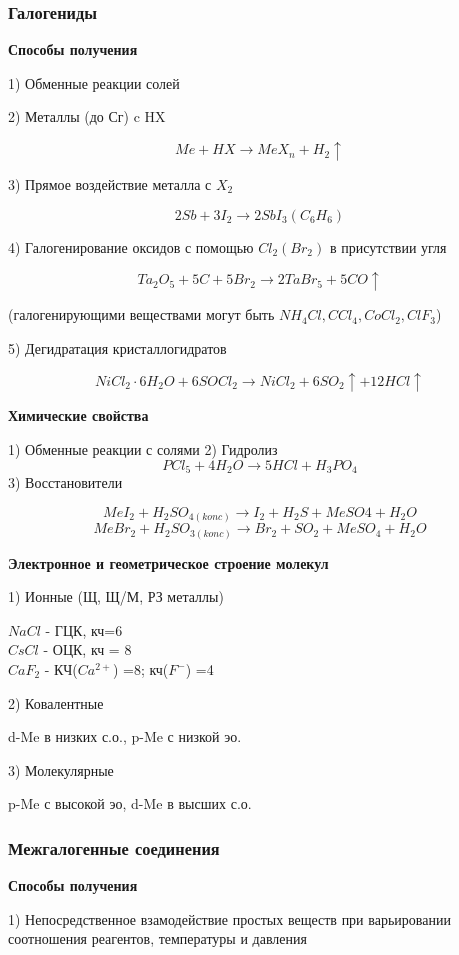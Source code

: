 \documentclass[14pt,a4paper]{scrartcl}
\begin{document}
\subsubsection{Галогениды}

\textbf{Способы получения}

1) Обменные реакции солей

2) Металлы (до Сг) c HX

$$Me + HX \rightarrow MeX_n + H_2\uparrow$$

3) Прямое воздействие металла с $X_2$

$$2Sb + 3I_2 \rightarrow 2SbI_3 (C_6H_6)$$

4) Галогенирование оксидов с помощью $Cl_2(Br_2)$ в присутствии угля

$$Ta_2O_5 + 5C + 5Br_2 \rightarrow 2TaBr_5 +5CO \uparrow$$

(галогенирующими веществами могут быть $NH_4Cl, CCl_4, CoCl_2, ClF_3$)

5) Дегидратация кристаллогидратов

$$NiCl_2\cdot6H_2O + 6SOCl_2 \rightarrow NiCl_2 + 6SO_2\uparrow + 12HCl\uparrow$$

\textbf{{Химические свойства}}

1) Обменные реакции с солями
2) Гидролиз
$$PCl_5 + 4H_2O \rightarrow 5HCl + H_3PO_4$$
3) Восстановители

$$MeI_2 + H_2SO_{4(konc)} \rightarrow I_2 + H_2S + MeSO4 + H_2O$$
$$MeBr_2 + H_2SO_{3(konc)} \rightarrow Br_2 + SO_2 + MeSO_4 + H_2O$$

\textbf{Электронное и геометрическое строение молекул}

1) Ионные (Щ, Щ/М, РЗ металлы)

$NaCl$ - ГЦК, кч=6\\
$CsCl$ - ОЦК, кч = 8\\
$CaF_2$ - КЧ($Ca^{2+}$) =8; кч($F^-$) =4

2) Ковалентные

d-Me в низких с.о., p-Me с низкой эо.

3) Молекулярные

p-Me с высокой эо, d-Me в высших с.о.

\subsubsection{Межгалогенные соединения}

\textbf{Способы получения}

1) Непосредственное взамодействие простых веществ при варьировании соотношения реагентов, температуры и давления
\end{document}
